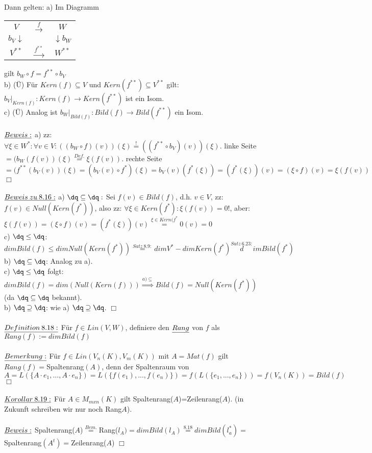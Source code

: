 \documentclass[fleqn, a4paper, 11pt]{article}
\begin{document}
Dann gelten: a) Im Diagramm \begin{tabular}{ccc}
	$V$ & $\stackrel{f}{\rightarrow}$ & $W$\\
	$b_V\downarrow$ & & $\downarrow b_W$\\
	$V^{\ast\ast}$ & $\stackrel{f^{\ast\ast}}{\rightarrow}$ & $W^{\ast\ast}$
\end{tabular} gilt $b_W\circ f=f^{\ast\ast}\circ b_V$\\
b) (\"U) F\"ur $Kern(f)\subseteq V$ und $Kern(f^{\ast\ast})\subseteq V^{\ast\ast}$ gilt: $b_V|_{Kern(f)}:Kern(f)\rightarrow Kern(f^{\ast\ast})$ ist ein Isom.\\
c) (\"U) Analog ist $b_W|_{Bild(f)}:Bild(f)\rightarrow Bild(f^{\ast\ast})$ ein Isom.\\
\\
$\uline{Beweis:}$ a) zz: $\forall\xi\in W^{\ast}:\forall v\in V:((b_W\circ f)(v))(\xi)\stackrel{!}{=}((f^{\ast\ast}\circ b_V)(v))(\xi)$. linke Seite$=(b_W(f(v))(\xi)\stackrel{Def.}{=}\xi(f(v))$. rechte Seite$=(f^{\ast\ast}(b_V(v))(\xi)=(b_V(v)\circ f^{\ast})(\xi)=b_V(v)(f^{\ast}(\xi))=(f^{\ast}(\xi))(v)=(\xi\circ f)(v)=\xi(f(v))$ \hfill $\Box$\\
\\
$\uline{Beweis\:zu\:8.16:}$ a) $\dq \subseteq \dq:$ Sei $f(v)\in Bild(f)$, d.h. $v\in V$, zz: $f(v)\in Null(Kern(f^{\ast}))$, also zz: $\forall\xi\in Kern(f^{\ast}):\xi(f(v))=0!$, aber: $\xi(f(v))=(\xi\circ f)(v)=(f^{\ast}(\xi))(v)\stackrel{\xi\in Kern(f^{\ast}}{=} 0(v)=0$\\
c) $\dq \leq \dq$: $dim Bild(f) \leq dim Null(Kern(f^{\ast}))\stackrel{Satz\:8.9:}{=} dim V^{\ast} - dim Kern(f^{\ast})\stackrel{Satz\:6.23:}dim Bild(f^{\ast})$\\
b) $\dq \subseteq \dq$: Analog zu a).\\
c) $\dq \leq \dq$ folgt: $dim Bild(f)=dim(Null(Kern(f)))\stackrel{a)\subseteq}{\Rightarrow}Bild(f)=Null(Kern(f^{\ast}))$ (da $\dq\subseteq\dq$ bekannt).\\
b) $\dq\supseteq\dq$: wie a) $\dq\supseteq \dq$. \hfill $\Box$\\
\\
$\uline{Definition\:8.18:}$ F\"ur $f\in Lin(V,W)$, definiere den $\uline{Rang}$ von $f$ als $Rang(f):=dim Bild(f)$\\
\\
$\uline{Bemerkung:}$ F\"ur $f\in Lin(V_n(K),V_m(K))$ mit $A=Mat(f)$ gilt $Rang(f)=$Spaltenrang$(A)$, denn der Spaltenraum von $A=L(\{A\cdot e_1,...,A\cdot e_n\})=L(\{f(e_1),...,f(e_n)\})=f(L(\{e_1,...,e_n\}))=f(V_n(K))=Bild(f)$ \hfill $\Box$\\
\\
$\uline{Korollar\:8.19:}$ F\"ur $A\in M_{mxn}(K)$ gilt Spaltenrang($A$)=Zeilenrang($A$). (in Zukunft schreiben wir nur noch Rang$A$).\\
\\
$\uline{Beweis:}$ Spaltenrang($A$)$\stackrel{Bem.}{=}$Rang($l_A)=dim Bild(l_A)\stackrel{8.18}{=} dim Bild(l_a^{\ast})=$Spaltenrang$(A^t)=$Zeilenrang($A$) \hfill $\Box$\\
\\
\newpage
\end{document}
